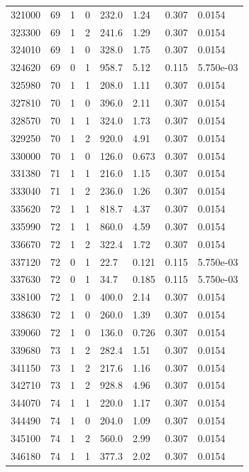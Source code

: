\documentclass[preview]{standalone}
\begin{document}
{{{{{{{{{\begin{tabular}{L{1.2cm}C{1.2cm} C{0.3cm}C{0.5cm} C{1.4cm}C{1.4cm} C{1.4cm}C{1.4cm}}
  321000  &    69  & 1     &  0 &  232.0  & 1.24  & 0.307 &  0.0154   \\ 
  323300  &    69  & 1     &  2 &  241.6  & 1.29  & 0.307 &  0.0154   \\ 
  324010  &    69  & 1     &  0 &  328.0  & 1.75  & 0.307 &  0.0154   \\ 
  324620  &    69  & 0     &  1 &  958.7  & 5.12  & 0.115 &  5.750e-03   \\ 
  325980  &    70  & 1     &  1 &  208.0  & 1.11  & 0.307 &  0.0154   \\ 
  327810  &    70  & 1     &  0 &  396.0  & 2.11  & 0.307 &  0.0154   \\ 
  328570  &    70  & 1     &  1 &  324.0  & 1.73  & 0.307 &  0.0154   \\ 
  329250  &    70  & 1     &  2 &  920.0  & 4.91  & 0.307 &  0.0154   \\ 
  330000  &    70  & 1     &  0 &  126.0  & 0.673  & 0.307 &  0.0154   \\ 
  331380  &    71  & 1     &  1 &  216.0  & 1.15  & 0.307 &  0.0154   \\ 
  333040  &    71  & 1     &  2 &  236.0  & 1.26  & 0.307 &  0.0154   \\ 
  335620  &    72  & 1     &  1 &  818.7  & 4.37  & 0.307 &  0.0154   \\ 
  335990  &    72  & 1     &  1 &  860.0  & 4.59  & 0.307 &  0.0154   \\ 
  336670  &    72  & 1     &  2 &  322.4  & 1.72  & 0.307 &  0.0154   \\ 
  337120  &    72  & 0     &  1 &  22.7  & 0.121  & 0.115 &  5.750e-03   \\ 
  337630  &    72  & 0     &  1 &  34.7  & 0.185  & 0.115 &  5.750e-03   \\ 
  338100  &    72  & 1     &  0 &  400.0  & 2.14  & 0.307 &  0.0154   \\ 
  338630  &    72  & 1     &  0 &  260.0  & 1.39  & 0.307 &  0.0154   \\ 
  339060  &    72  & 1     &  0 &  136.0  & 0.726  & 0.307 &  0.0154   \\ 
  339680  &    73  & 1     &  2 &  282.4  & 1.51  & 0.307 &  0.0154   \\ 
  341150  &    73  & 1     &  2 &  217.6  & 1.16  & 0.307 &  0.0154   \\ 
  342710  &    73  & 1     &  2 &  928.8  & 4.96  & 0.307 &  0.0154   \\ 
  344070  &    74  & 1     &  1 &  220.0  & 1.17  & 0.307 &  0.0154   \\ 
  344490  &    74  & 1     &  0 &  204.0  & 1.09  & 0.307 &  0.0154   \\ 
  345100  &    74  & 1     &  2 &  560.0  & 2.99  & 0.307 &  0.0154   \\ 
  346180  &    74  & 1     &  1 &  377.3  & 2.02  & 0.307 &  0.0154   \\ 
\hline 
\end{tabular} 

}}}}}}}}}
\end{document}
